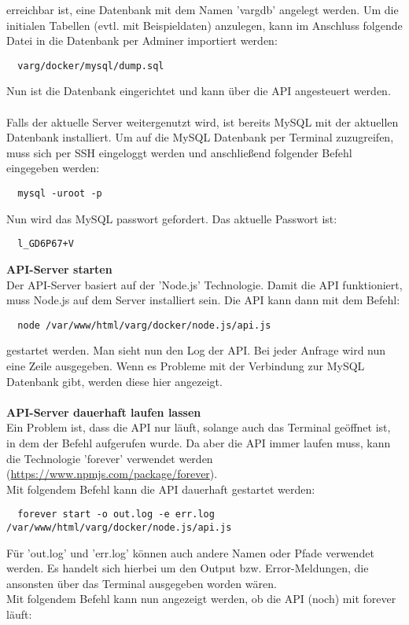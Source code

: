 \documentclass[twoside]{report}
\begin{document}
erreichbar ist, eine Datenbank mit dem Namen 'vargdb' angelegt werden. Um die initialen Tabellen (evtl. mit Beispieldaten) anzulegen, kann im 
Anschluss folgende Datei in die Datenbank per Adminer importiert werden:
\begin{verbatim}
  varg/docker/mysql/dump.sql
\end{verbatim} 
Nun ist die Datenbank eingerichtet und kann über die API angesteuert werden.
\\\\Falls der aktuelle Server weitergenutzt wird, ist bereits MySQL mit der aktuellen Datenbank installiert. Um auf die MySQL Datenbank per
Terminal zuzugreifen, muss sich per SSH eingeloggt werden und anschließend folgender Befehl eingegeben werden:
\begin{verbatim}
  mysql -uroot -p
\end{verbatim}
Nun wird das MySQL passwort gefordert. Das aktuelle Passwort ist:
\begin{verbatim}
  l_GD6P67+V
\end{verbatim}
\textbf{API-Server starten}
\\Der API-Server basiert auf der 'Node.js' Technologie. Damit die API funktioniert, muss Node.js auf dem Server installiert sein.
Die API kann dann mit dem Befehl:
\begin{verbatim}
  node /var/www/html/varg/docker/node.js/api.js
\end{verbatim}
gestartet werden. Man sieht nun den Log der API. Bei jeder Anfrage wird nun eine Zeile ausgegeben. Wenn es Probleme mit der Verbindung
zur MySQL Datenbank gibt, werden diese hier angezeigt.
\\\\
\textbf{API-Server dauerhaft laufen lassen}
\\Ein Problem ist, dass die API nur läuft, solange auch das Terminal geöffnet ist, in dem der Befehl aufgerufen wurde.
Da aber die API immer laufen muss, kann die Technologie 'forever' verwendet werden (\url{https://www.npmjs.com/package/forever}).\\
Mit folgendem Befehl kann die API dauerhaft gestartet werden:
\begin{verbatim}
  forever start -o out.log -e err.log /var/www/html/varg/docker/node.js/api.js
\end{verbatim}
Für 'out.log' und 'err.log' können auch andere Namen oder Pfade verwendet werden. Es handelt sich hierbei um den Output bzw. Error-Meldungen,
die ansonsten über das Terminal ausgegeben worden wären.
\\Mit folgendem Befehl kann nun angezeigt werden, ob die API (noch) mit forever läuft:
\end{document}
